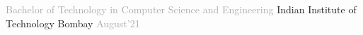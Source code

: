\begin{cventries}
  \cventry
    {\fontsize{9.5pt}{1em}\descriptionfont\textcolor{darkgray}{Bachelor of Technology in Computer Science and Engineering}}
    {Indian Institute of Technology Bombay}
    {\fontsize{9pt}{1em} \textcolor{darkgray}{August'21}}
    {}
    {
    }
\end{cventries}
